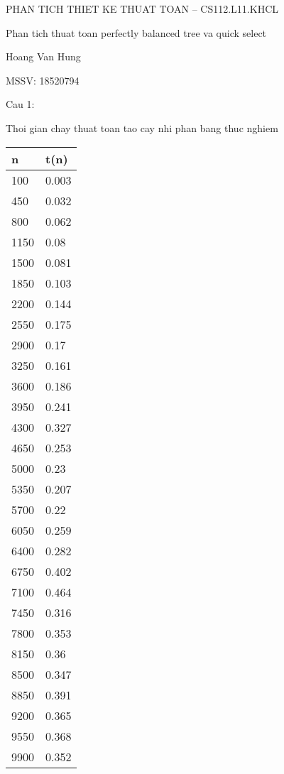 \documentclass{article}
\begin{document}
\noindent PHAN TICH THIET KE THUAT TOAN -- CS112.L11.KHCL

\noindent Phan tich thuat toan perfectly balanced tree va quick select

\noindent Hoang Van Hung

\noindent MSSV: 18520794

\noindent Cau 1:

\noindent Thoi gian chay thuat toan tao cay nhi phan bang thuc nghiem

\begin{tabular}{|p{0.7in}|p{0.7in}|} \hline 
n & t(n) \\ \hline 
100 & 0.003 \\ \hline 
450 & 0.032 \\ \hline 
800 & 0.062 \\ \hline 
1150 & 0.08 \\ \hline 
1500 & 0.081 \\ \hline 
1850 & 0.103 \\ \hline 
2200 & 0.144 \\ \hline 
2550 & 0.175 \\ \hline 
2900 & 0.17 \\ \hline 
3250 & 0.161 \\ \hline 
3600 & 0.186 \\ \hline 
3950 & 0.241 \\ \hline 
4300 & 0.327 \\ \hline 
4650 & 0.253 \\ \hline 
5000 & 0.23 \\ \hline 
5350 & 0.207 \\ \hline 
5700 & 0.22 \\ \hline 
6050 & 0.259 \\ \hline 
6400 & 0.282 \\ \hline 
6750 & 0.402 \\ \hline 
7100 & 0.464 \\ \hline 
7450 & 0.316 \\ \hline 
7800 & 0.353 \\ \hline 
8150 & 0.36 \\ \hline 
8500 & 0.347 \\ \hline 
8850 & 0.391 \\ \hline 
9200 & 0.365 \\ \hline 
9550 & 0.368 \\ \hline 
9900 & 0.352 \\ \hline 
\end{tabular}
\end{document}
